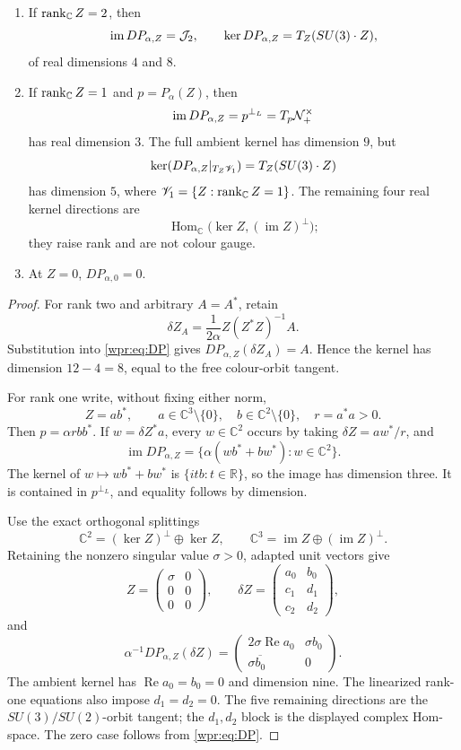 \begin{lemma}
\label{wpr:lem:ranks}
\begin{enumerate}[label=\textup{(\roman*)}]
\item If \(\operatorname{rank}_{\mathbb C} Z=2\), then
\[
 \operatorname{im}D P_{\alpha,Z}=\mathcal J_2,\qquad
 \ker D P_{\alpha,Z}=T_Z(SU(3)\cdot Z),
\]
of real dimensions \(4\) and \(8\).
\item If \(\operatorname{rank}_{\mathbb C} Z=1\) and \(p=P_\alpha(Z)\), then
\[
 \operatorname{im}D P_{\alpha,Z}=p^{\perp_L}=T_p\mathcal N_+^\times
\]
has real dimension \(3\).  The full ambient kernel has dimension \(9\),
but
\[
 \ker(D P_{\alpha,Z}|_{T_Z{\mathscr V}_1})=T_Z(SU(3)\cdot Z)
\]
has dimension \(5\), where \({\mathscr V}_1=\{Z:\operatorname{rank}_{\mathbb C} Z=1\}\).  The remaining
four real kernel directions are
\[
 \operatorname{Hom}_{\mathbb C}
 \bigl(\ker Z,(\operatorname{im}Z)^\perp\bigr);
\]
they raise rank and are not colour gauge.
\item At \(Z=0\), \(D P_{\alpha,0}=0\).
\end{enumerate}
\end{lemma}
\begin{proof}
For rank two and arbitrary \(A=A^*\), retain
\[
 \delta Z_A=\frac1{2\alpha}Z(Z^*Z)^{-1}A.
\]
Substitution into \eqref{wpr:eq:DP} gives
\(D P_{\alpha,Z}(\delta Z_A)=A\).  Hence the kernel has dimension
\(12-4=8\), equal to the free colour-orbit tangent.

For rank one write, without fixing either norm,
\[
 Z=ab^*,\qquad a\in\mathbb C^3\setminus\{0\},\quad
 b\in\mathbb C^2\setminus\{0\},\quad r=a^*a>0.
\]
Then \(p=\alpha rbb^*\).  If \(w=\delta Z^*a\), every
\(w\in\mathbb C^2\) occurs by taking \(\delta Z=aw^*/r\), and
\[
 \operatorname{im}D P_{\alpha,Z}
 =\{\alpha(wb^*+bw^*):w\in\mathbb C^2\}.
\]
The kernel of \(w\mapsto wb^*+bw^*\) is
\(\{itb:t\in\mathbb R\}\), so the image has dimension three.  It is
contained in \(p^{\perp_L}\), and equality follows by dimension.

Use the exact orthogonal splittings
\[
 \mathbb C^2=(\ker Z)^\perp\oplus\ker Z,\qquad
 \mathbb C^3=\operatorname{im}Z\oplus(\operatorname{im}Z)^\perp.
\]
Retaining the nonzero singular value \(\sigma>0\), adapted unit vectors
give
\[
 Z=\begin{pmatrix}\sigma&0\\0&0\\0&0\end{pmatrix},\qquad
 \delta Z=\begin{pmatrix}a_0&b_0\\c_1&d_1\\c_2&d_2\end{pmatrix},
\]
and
\[
 \alpha^{-1}D P_{\alpha,Z}(\delta Z)=
 \begin{pmatrix}
 2\sigma\operatorname{Re}a_0&\sigma b_0\\
 \sigma\overline{b_0}&0
 \end{pmatrix}.
\]
The ambient kernel has \(\operatorname{Re}a_0=b_0=0\) and dimension
nine.  The linearized rank-one equations also impose \(d_1=d_2=0\).
The five remaining directions are the \(SU(3)/SU(2)\)-orbit tangent;
the \(d_1,d_2\) block is the displayed complex Hom-space.  The zero
case follows from \eqref{wpr:eq:DP}.
\end{proof}

